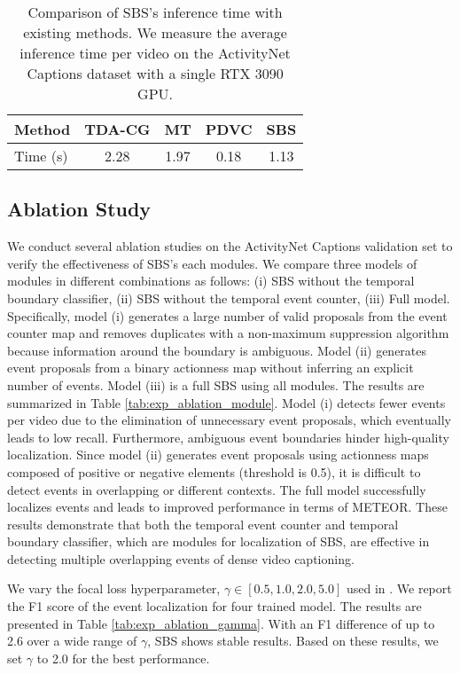 \begin{table}[t]
  \centering
  \caption{
    {Comparison of SBS's inference time with existing methods.
        We measure the average inference time per video on the ActivityNet Captions dataset with a single RTX 3090 GPU.}
  }
  \begin{tabular}{l|cccc}
    \hline
    {Method}   & {TDA-CG \cite{wang2018bidirectional}} & {MT \cite{zhou2018end}} & {PDVC \cite{wang2021end}} & {{SBS}}  \\
    \hline
    {Time (s)} & {2.28}                                & {1.97}                  & {0.18}                    & {{1.13}} \\
    \hline
  \end{tabular}
  \label{tab:eval_inference_time}
\end{table}

\subsection{Ablation Study}
\label{subsec:exp_ablation}

We conduct several ablation studies on the ActivityNet Captions validation set to verify the effectiveness of SBS's each modules.
We compare three models of modules in different combinations as follows: (i) SBS without the temporal boundary classifier, (ii) SBS without the temporal event counter, (iii) Full model.
Specifically, model (i) generates a large number of valid proposals from the event counter map and removes duplicates with a non-maximum suppression algorithm because information around the boundary is ambiguous.
Model (ii) generates event proposals from a binary actionness map without inferring an explicit number of events.
Model (iii) is a full SBS using all modules.
The results are summarized in Table \ref{tab:exp_ablation_module}.
Model (i) detects fewer events per video due to the elimination of unnecessary event proposals, which eventually leads to low recall.
Furthermore, ambiguous event boundaries hinder high-quality localization.
Since model (ii) generates event proposals using actionness maps composed of positive or negative elements (threshold is 0.5), it is difficult to detect events in overlapping or different contexts.
The full model successfully localizes events and leads to improved performance in terms of METEOR.
These results demonstrate that both the temporal event counter and temporal boundary classifier, which are modules for localization of SBS, are effective in detecting multiple overlapping events of dense video captioning.

We vary the focal loss hyperparameter, $\gamma \in \left[0.5, 1.0, 2.0, 5.0\right]$ used in \cite{lin2017focal}.
We report the F1 score of the event localization for four trained model.
The results are presented in Table \ref{tab:exp_ablation_gamma}.
With an F1 difference of up to 2.6 over a wide range of $\gamma$, SBS shows stable results.
Based on these results, we set $\gamma$ to 2.0 for the best performance.